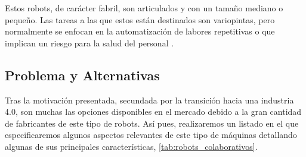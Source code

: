 Estos robots, de carácter fabril, son articulados y con un tamaño mediano o pequeño. Las tareas a las que estos están destinados son variopintas, pero normalmente se enfocan en la automatización de labores repetitivas o que implican un riesgo para la salud del personal \cite{60}.

\subsection{Problema y Alternativas}
Tras la motivación presentada, secundada por la transición hacia una industria 4.0, son muchas las opciones disponibles en el mercado debido a la gran cantidad de fabricantes de este tipo de robots. Así pues, realizaremos un listado en el que especificaremos algunos aspectos relevantes de este tipo de máquinas detallando algunas de sus principales características, \ref{tab:robots_colaborativos}.

